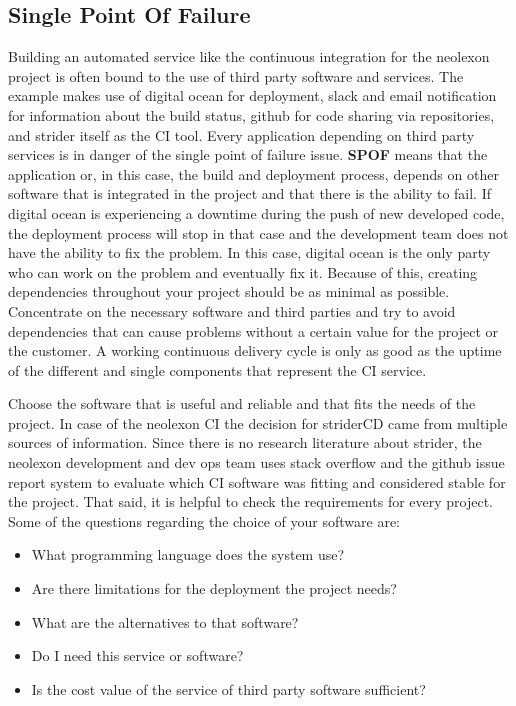 \subsection{Single Point Of Failure}
\label{section:Single Point Of Failure}
Building an automated service like the continuous integration for the neolexon project is often bound to the use of third party software and services.
The example makes use of digital ocean for deployment, slack and email notification for information about the build status, github for code sharing
via repositories, and strider itself as the CI tool. Every application depending on third party services is in danger of the single point of failure
issue. \textbf{SPOF} means that the application or, in this case, the build and deployment process, depends on other software that is integrated in the
project and that there is the ability to fail. If digital ocean is experiencing a downtime during the push of new developed code, the deployment
process will stop in that case and the development team does not have the ability to fix the problem. In this case, digital ocean is the only party
who can work on the problem and eventually fix it. Because of this, creating dependencies throughout your project should be as minimal as possible.
Concentrate on the necessary software and third parties and try to avoid dependencies that can cause problems without a certain value for the project
or the customer. A working continuous delivery cycle is only as good as the uptime of the different and single components that represent the CI service.

Choose the software that is useful and reliable and that fits the needs of the project. In case of the neolexon CI the decision for striderCD came from
multiple sources of information. Since there is no research literature about strider, the neolexon development and dev ops team uses stack overflow and the
github issue report system to evaluate which CI software was fitting and considered stable for the project. That said, it is helpful to check the requirements
for every project. Some of the questions regarding the choice of your software are:

\begin{itemize}
  \item What programming language does the system use?
  \item Are there limitations for the deployment the project needs?
  \item What are the alternatives to that software?
  \item Do I need this service or software?
  \item Is the cost value of the service of third party software sufficient?
\end{itemize} \cite{ulbrich2012eliminating}

